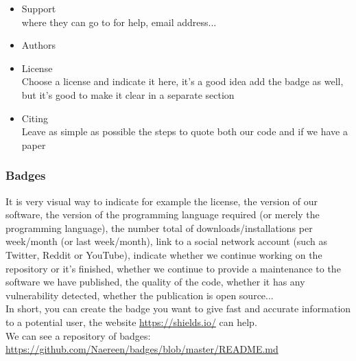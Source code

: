 \documentclass[a4paper]{article}
\begin{document}
\begin{itemize}
\begin{comment}
			\end{comment}
				\item Support \\
					where they can go to for help, email address...
				\item Authors
			\begin{comment}
				\item Road map (optional):\\
					If we've ideas for releases in the future
				\item Contributing (optional)\\
					State if you are open to contributions and what your requirements are for accepting them.
			\end{comment}
				\item License\\
					Choose a license and indicate it here, it's a good idea add the badge as well, but it's good to make it clear in a separate section
				\item Citing\\
					Leave as simple as possible the steps to quote both our code and if we have a paper
			\begin{comment}
				\item Project status\\
					We can write a section or put a badge or note at the top of the README
			
				\item References (optional)\\
			\end{comment}
			\end{itemize}
			\subsubsection{Badges}
				It is very visual way to indicate for example the license, the version of our software, the version of the programming language required (or merely the programming language), the number total of downloads/installations per week/month (or last week/month), link to a social network account (such as Twitter, Reddit or YouTube), indicate whether we continue working on the repository or it's finished, whether we continue to provide a maintenance to the software we have published, the quality of the code, whether it has any vulnerability detected, whether the publication is open source...\\
				In short, you can create the badge you want to give fast and accurate information to a potential user, the website \url{https://shields.io/}  can help.\\
				We can see a repository of badges: \url{https://github.com/Naereen/badges/blob/master/README.md}\\
\end{document}
